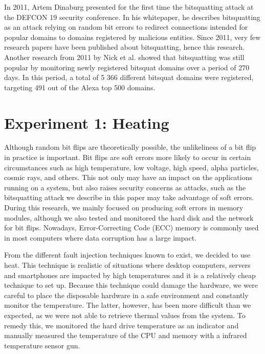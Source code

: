 \documentclass[conference]{IEEEtran}
\begin{document}
In 2011, Artem Dinaburg presented for the first time the bitsquatting attack at
the DEFCON 19 security conference. In his
whitepaper\cite{dinaburg2011bitsquatting}, he describes bitsquatting as an
attack relying on random bit errors to redirect connections intended for
popular domains to domains registered by malicious entities. Since 2011, very
few research papers have been published about bitsquatting, hence this
research. Another research from 2011 by Nick et
al.\cite{nikiforakis2013bitsquatting} showed that bitsquatting was still
popular by monitoring newly registered bitsquat domains over a period of
270 days. In this period, a total of 5 366 different bitsquat domains were
registered, targeting 491 out of the Alexa top 500 domains.

\section{Experiment 1: Heating}

Although random bit flips are theoretically possible, the unlikeliness of a bit
flip in practice is important. Bit flips are soft errors more likely to
occur in certain circumstances such as high temperature, low voltage, high
speed, alpha particles, cosmic rays, and others. This not only may have an
impact on the applications running on a system, but also raises security
concerns as attacks, such as the bitsquatting attack we describe in this paper
may take advantage of soft errors. During this research, we mainly focused on
producing soft errors in memory modules, although we also tested and monitored
the hard disk and the network for bit flips. Nowadays, Error-Correcting Code
(ECC) memory is commonly used in most computers where data corruption has a
large impact.

From the different fault injection techniques known to
exist\cite{barenghi2012fault}, we decided to use heat. This technique is
realistic of situations where desktop computers, servers and smartphones are
impacted by high temperatures and it is a relatively cheap technique to set up.
Because this technique could damage the hardware, we were careful to place the
disposable hardware in a safe environment and constantly monitor the
temperature. The latter, however, has been more difficult than we expected, as
we were not able to retrieve thermal values from the system. To remedy this, we
monitored the hard drive temperature as an indicator and manually measured the
temperature of the CPU and memory with a infrared temperature sensor gun.
\end{document}
